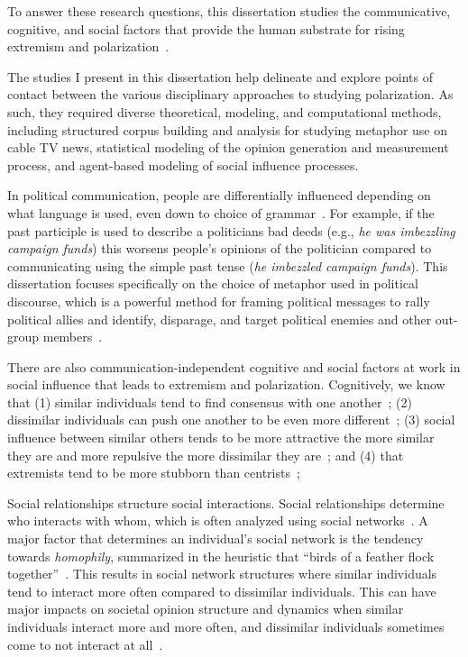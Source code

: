 \documentclass[12pt,letterpaper]{article}
\begin{document}
To answer these research questions, this dissertation studies the communicative, cognitive,
and social factors that provide the human substrate for rising extremism
and polarization~\cite{Jung2019,Rollwage2019}. 

The studies I present in this dissertation help delineate and explore points of contact between
the various disciplinary approaches to studying polarization. As such, they
required diverse theoretical, modeling, and computational methods, 
including structured corpus building and analysis for studying metaphor
use on cable TV news, statistical modeling of the opinion generation and
measurement process, and agent-based modeling of social influence processes.

In political communication, people are differentially
influenced depending on what language is used, even down to choice of 
grammar~\cite{Matlock2012}. For example, if the past participle is used
to describe a politicians bad deeds (e.g., \emph{he was imbezzling campaign
funds}) this worsens people's opinions of the politician compared to 
communicating using the simple past tense (\emph{he imbezzled campaign funds}).
This dissertation focuses specifically on the choice of metaphor used 
in political discourse, which is a powerful method for framing political 
messages to rally political allies and identify, disparage, and target
political enemies and other out-group members~\cite{OBrien2003,Charteris-Black2009,Landau2010}.

There are also communication-independent cognitive and social factors at work
in social influence that leads to extremism and polarization. Cognitively,
we know that (1) similar individuals tend to find consensus with one another~\cite{French1956,DeGroot1974};
(2) dissimilar individuals can push one another to be even more 
different~\cite{Cikara2014,Bail2018};
(3) social influence between similar others tends to be more attractive the more
similar they are and more repulsive the more dissimilar they are~\cite{Lord1979,Ross2012};
and (4) that extremists tend to be more stubborn than centrists~\cite{Reiss2019,Zmigrod2019a};

Social relationships structure social interactions. Social relationships
determine who interacts with whom, which is often analyzed using social
networks~\cite{Watts1999}. A major factor that determines an individual's social
network is the tendency towards \emph{homophily}, summarized in the heuristic
that ``birds of a feather flock together''~\cite{McPherson2001}. This results
in social network structures where similar individuals tend to interact more
often compared to dissimilar individuals. This can have major impacts on 
societal opinion structure and dynamics when similar individuals interact more
and more often, and dissimilar individuals sometimes come to not interact at
all~\cite{Axelrod1997,Centola2007,DellaPosta2015}.
\end{document}
